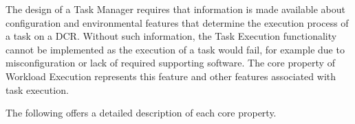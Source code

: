 \documentclass{sig-alternate}
\begin{document}
The design of a Task Manager requires that information is made available about
configuration and environmental features that determine the execution process of
a task on a DCR. Without such information, the Task Execution functionality
cannot be implemented as the execution of a task would fail, for example due
to misconfiguration or lack of required supporting software.  The core property
of Workload Execution represents this feature and other features associated with
task execution.

The following offers a detailed description of each core property.




\end{document}
